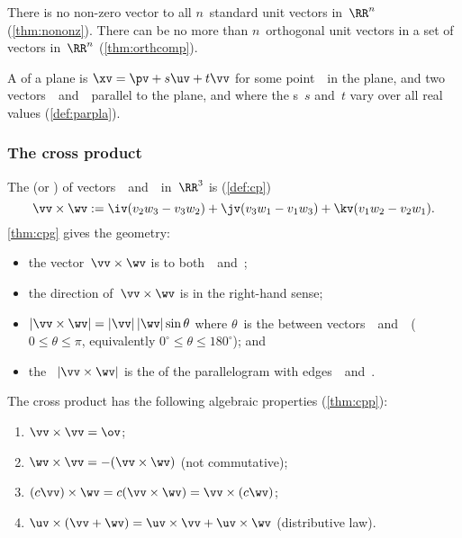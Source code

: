 \begin{itemize}
\itemlo There is no non-zero vector  to all \(n\)~{standard unit vector}s in~\(\RR^n\) (\autoref{thm:nononz}).
There can be no more than \(n\)~orthogonal unit vectors in a set of vectors in~\(\RR^n\) (\autoref{thm:orthcomp}).

\itemlo A  of a plane is \(\xv=\pv+s\uv+t\vv\) for some point~\pv\ in the plane, and two vectors~\uv\ and~\vv\  parallel to the plane, and where the  s~\(s\) and~\(t\) vary over all real values (\autoref{def:parpla}).




\subsubsection{The cross product}

\itemhi The   (or ) of vectors~\vv\ and~\wv\ in~\(\RR^3\) is (\autoref{def:cp})
\begin{equation*}
\vv\times\wv:=\iv(v_2w_3-v_3w_2)
+\jv(v_3w_1-v_1w_3)
+\kv(v_1w_2-v_2w_1).
\end{equation*}
\autoref{thm:cpg} gives the geometry:
\begin{itemize}
\item the vector~\(\vv\times\wv\) is  to both~\vv\ and~\wv;

\item the direction of~\(\vv\times\wv\) is in the right-hand sense; 

\item \(|\vv\times\wv|=|\vv|\,|\wv|\sin\theta\) where \(\theta\)~is the  between vectors~\vv\ and~\wv\ (\(0\leq\theta\leq\pi\), equivalently \(0^\circ\leq\theta\leq180^\circ\)); and

\item the ~\(|\vv\times\wv|\) is the  of the parallelogram with edges~\vv\ and~\wv.
\end{itemize}

\itemlo The cross product has the following algebraic properties (\autoref{thm:cpp}):
\begin{enumerate}
\item \(\vv\times\vv=\ov\);
\item \(\wv\times\vv=-(\vv\times\wv)\) \quad(not commutative);
\item \((c\vv)\times\wv=c(\vv\times\wv)=\vv\times(c\wv)\);
\item \(\uv\times(\vv+\wv)=\uv\times\vv+\uv\times\wv\) \quad({distributive law}).
\end{enumerate}


\end{itemize}
